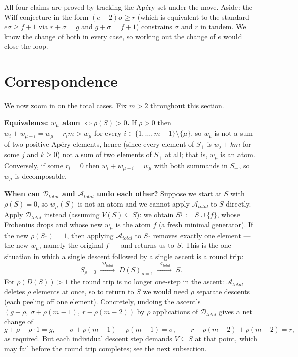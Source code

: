 \documentclass[11pt, a4paper]{article}
\begin{document}
All four claims are proved by tracking the Apéry set under the move.
Aside: the Wilf conjecture in the form $(e-2)\sigma \ge r$ (which is
equivalent to the standard $e\sigma \ge f+1$ via $r + \sigma = g$ and
$g + \sigma = f+1$) constrains $\sigma$ and $r$ in tandem. We know
the change of both in every case, so working out the change of $e$
would close the loop.

\section{Correspondence}

We now zoom in on the total cases. Fix $m > 2$ throughout this section.

\textbf{Equivalence: $w_\mu$ atom $\Leftrightarrow \rho(S) > 0$.}
If $\rho > 0$ then $w_i + w_{\mu-i} = w_\mu + r_i m > w_\mu$ for every
$i \in \{1,\dots,m-1\}\setminus\{\mu\}$, so $w_\mu$ is not a sum of
two positive Apéry elements, hence (since every element of $S_+$ is
$w_j + km$ for some $j$ and $k \ge 0$) not a sum of two elements of
$S_+$ at all; that is, $w_\mu$ is an atom. Conversely, if some
$r_i = 0$ then $w_i + w_{\mu-i} = w_\mu$ with both summands in $S_+$,
so $w_\mu$ is decomposable.

\textbf{When can $\mathcal{D}_{total}$ and $\mathcal{A}_{total}$ undo
each other?} Suppose we start at $S$ with $\rho(S) = 0$, so
$w_\mu(S)$ is not an atom and we cannot apply $\mathcal{A}_{total}$
to $S$ directly. Apply $\mathcal{D}_{total}$ instead (assuming
$V(S) \subseteq S$): we obtain $S^\downarrow := S \cup \{f\}$, whose
Frobenius drops and whose new $w_\mu$ is the atom $f$ (a fresh
minimal generator). If the new $\rho(S^\downarrow) = 1$, then
applying $\mathcal{A}_{total}$ to $S^\downarrow$ removes exactly one
element --- the new $w_\mu$, namely the original $f$ --- and returns
us to $S$. This is the one situation in which a single descent
followed by a single ascent is a round trip:
\[
   S_{\rho = 0}
   \;\xrightarrow{\;\mathcal{D}_{total}\;}\;
   D(S)_{\rho = 1}
   \;\xrightarrow{\;\mathcal{A}_{total}\;}\;
   S.
\]
For $\rho(D(S)) > 1$ the round trip is no longer one-step in the
ascent: $\mathcal{A}_{total}$ deletes $\rho$ elements at once, so to
return to $S$ we would need $\rho$ separate descents (each
peeling off one element). Concretely, undoing the ascent's
$(g + \rho,\ \sigma + \rho(m-1),\ r - \rho(m-2))$ by $\rho$
applications of $\mathcal{D}_{total}$ gives a net change of
\[
   g + \rho - \rho \cdot 1 = g,\qquad
   \sigma + \rho(m-1) - \rho(m-1) = \sigma,\qquad
   r - \rho(m-2) + \rho(m-2) = r,
\]
as required. But each individual descent step demands
$V \subseteq S$ at that point, which may fail before the round trip
completes; see the next subsection.
\end{document}

